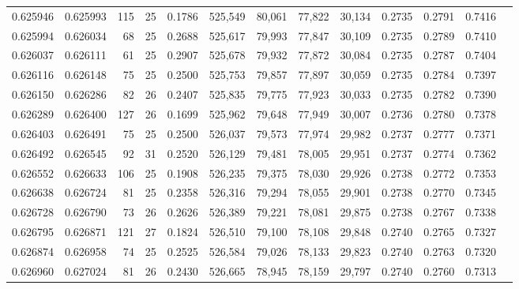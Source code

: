 \begin{tabular}{rrrrrrrrrrrrr}
0.625946 & 0.625993 & 115 &  25 &                                     0.1786 & 525,549 &  80,061 &  77,822 &  30,134 & 0.2735 & 0.2791 & 0.7416 \\
0.625994 & 0.626034 &  68 &  25 &                                     0.2688 & 525,617 &  79,993 &  77,847 &  30,109 & 0.2735 & 0.2789 & 0.7410 \\
0.626037 & 0.626111 &  61 &  25 &                                     0.2907 & 525,678 &  79,932 &  77,872 &  30,084 & 0.2735 & 0.2787 & 0.7404 \\
0.626116 & 0.626148 &  75 &  25 &                                     0.2500 & 525,753 &  79,857 &  77,897 &  30,059 & 0.2735 & 0.2784 & 0.7397 \\
0.626150 & 0.626286 &  82 &  26 &                                     0.2407 & 525,835 &  79,775 &  77,923 &  30,033 & 0.2735 & 0.2782 & 0.7390 \\
0.626289 & 0.626400 & 127 &  26 &                                     0.1699 & 525,962 &  79,648 &  77,949 &  30,007 & 0.2736 & 0.2780 & 0.7378 \\
0.626403 & 0.626491 &  75 &  25 &                                     0.2500 & 526,037 &  79,573 &  77,974 &  29,982 & 0.2737 & 0.2777 & 0.7371 \\
0.626492 & 0.626545 &  92 &  31 &                                     0.2520 & 526,129 &  79,481 &  78,005 &  29,951 & 0.2737 & 0.2774 & 0.7362 \\
0.626552 & 0.626633 & 106 &  25 &                                     0.1908 & 526,235 &  79,375 &  78,030 &  29,926 & 0.2738 & 0.2772 & 0.7353 \\
0.626638 & 0.626724 &  81 &  25 &                                     0.2358 & 526,316 &  79,294 &  78,055 &  29,901 & 0.2738 & 0.2770 & 0.7345 \\
0.626728 & 0.626790 &  73 &  26 &                                     0.2626 & 526,389 &  79,221 &  78,081 &  29,875 & 0.2738 & 0.2767 & 0.7338 \\
0.626795 & 0.626871 & 121 &  27 &                                     0.1824 & 526,510 &  79,100 &  78,108 &  29,848 & 0.2740 & 0.2765 & 0.7327 \\
0.626874 & 0.626958 &  74 &  25 &                                     0.2525 & 526,584 &  79,026 &  78,133 &  29,823 & 0.2740 & 0.2763 & 0.7320 \\
0.626960 & 0.627024 &  81 &  26 &                                     0.2430 & 526,665 &  78,945 &  78,159 &  29,797 & 0.2740 & 0.2760 & 0.7313 \\

\end{tabular}
